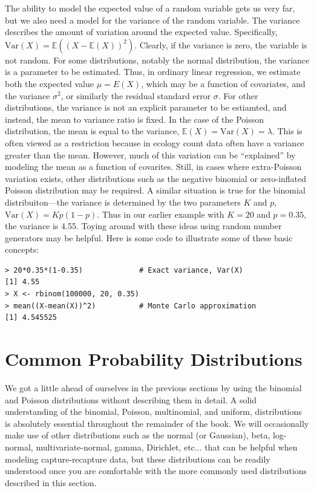 The ability to model the expected value of a random variable gets us
very far, but we also need a model for the variance of the random
variable. The variance %
describes the amount of variation around the expected
value. Specifically, $\text{Var}(X) = \mathbb{E}((X -
\mathbb{E}(X))^2)$. Clearly, if the variance is zero, the variable is
not random.
For some distributions, notably the normal distribution, the variance
is a parameter to be estimated. Thus, in ordinary linear regression,
we estimate both the expected value $\mu=E(X)$,
which may be a function of covariates, and the variance
$\sigma^2$, or similarly the residual standard error $\sigma$. For
other distributions, the variance is not an explicit parameter to be
estiamted, and instead, the mean to variance ratio is fixed. In the
case of the Poisson distribution, the mean is equal to the
variance, $\mathbb{E}(X) = \text{Var}(X) = \lambda$. This is often viewed as a restriction because in ecology
count data often have a variance greater than the mean. However, much
of this variation can be ``explained'' by modeling the mean as a
function of covarites. Still, in cases where extra-Poisson variation
exists, other distributions such as the negative binomial or
zero-inflated Poisson distribution may be required. A similar
situation is true for the binomial distribuiton---the variance is
determined by the two parameters $K$ and $p$, $\text{Var}(X) = Kp(1-p)$. Thus
in our earlier example with $K=20$ and $p=0.35$, the variance is
4.55. Toying around with these ideas using random number generators
may be helpful. Here is some code to illustrate some of these basic concepts:
\begin{verbatim}
> 20*0.35*(1-0.35)             # Exact variance, Var(X)
[1] 4.55
> X <- rbinom(100000, 20, 0.35)
> mean((X-mean(X))^2)          # Monte Carlo approximation
[1] 4.545525
\end{verbatim}



\section{Common Probability Distributions}
\label{sec.modeling.distributions}

We got a little ahead of ourselves in the previous sections by using
the binomial and Poisson distributions without describing them in detail.
A solid understanding of the binomial, Poisson, multinomial, and uniform,
distributions is absolutely essential throughout the
remainder of the book. We will occasionally make use of other
distributions such as the normal (or Gaussian), beta, log-normal, multivariate-normal,
gamma, Dirichlet, etc$\dots$ that can be helpful when
modeling capture-recapture data, but these distributions can be
readily understood once you are comfortable with the more commonly
used distributions described in this section.

